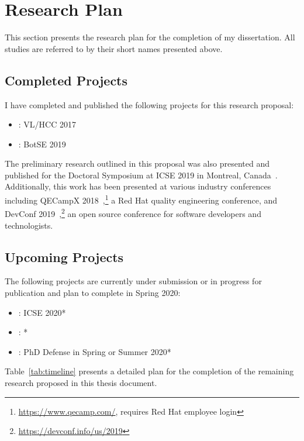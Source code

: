 \section{Research Plan}

This section presents the research plan for the completion of my dissertation. All studies are referred to by their short names presented above.

\subsection{Completed Projects}

I have completed and published the following projects for this research proposal:

\begin{itemize}
    \item[] \peer: VL/HCC 2017~\cite{VLHCC}
    \item[] \sorry: BotSE 2019~\cite{BotSE}
\end{itemize}

The preliminary research outlined in this proposal was also presented and published for the Doctoral Symposium at ICSE 2019 in Montreal, Canada~\cite{Symposium}. Additionally, this work has been presented at various industry conferences including QECampX 2018~\cite{QECamp},\footnote{\url{https://www.qecamp.com/}, requires Red Hat employee login} a Red Hat quality engineering conference, and DevConf 2019~\cite{DevConf},\footnote{\url{https://devconf.info/us/2019}} an open source conference for software developers and technologists.

\subsection{Upcoming Projects}

The following projects are currently under submission or in progress for publication and plan to complete in Spring 2020:

\begin{itemize}
    \item[] \sugg: ICSE 2020*
    \item[] \nudge: *
    \item[] \diss: PhD Defense in Spring or Summer 2020*
\end{itemize}

Table~\ref{tab:timeline} presents a detailed plan for the completion of the remaining research proposed in this thesis document.

